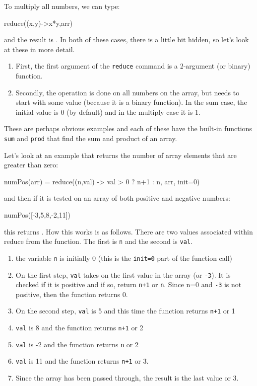 To multiply all numbers, we can type:
%
\begin{jlblock}[fp]
reduce((x,y)->x*y,arr)
\end{jlblock}
and the result is \printpythontex[verb].  In both of these cases, there is a little bit hidden, so let's look at these in more detail. 
\begin{enumerate}
\item  First, the first argument of the \texttt{reduce} command is a 2-argument (or binary) function.  
\item Secondly, the operation is done on all numbers on the array, but needs to start with some value (because it is a binary function).  In the sum case, the initial value is 0 (by default) and in the multiply case it is 1.  
\end{enumerate}


These are perhaps obvious examples and each of these have the built-in functions \texttt{sum} and \texttt{prod} that find the sum and product of an array. 

Let's look at an example that returns the number of array elements that are greater than zero:
%
\begin{jlblock}[fp]
numPos(arr) = reduce((n,val) -> val > 0 ? n+1 : n, arr, init=0)
\end{jlblock}
%
and then if it is tested on an array of both positive and negative
numbers:
%
\begin{jlblock}[fp]
numPos([-3,5,8,-2,11])
\end{jlblock}
%
this returns \printpythontex[verb]. How this works is as follows. There are two values
associated within reduce from the function. The first is \texttt{n} and the second is \texttt{val}.

\begin{enumerate}
\item  the variable \texttt{n} is initially 0 (this is the \texttt{init=0}
  part of the function call)
\item  On the first step, \texttt{val} takes on the first value in the array
  (or \texttt{-3}). It is checked if it is positive and if so, return
  \texttt{n+1} or \texttt{n}.  Since n=0 and \texttt{-3} is not positive, then the function returns 0.
\item  On the second step, \texttt{val} is 5 and this time the function
  returns \texttt{n+1} or 1
\item  \texttt{val} is 8 and the function returns \texttt{n+1} or 2
\item  \texttt{val} is -2 and the function returns \texttt{n} or 2
\item  \texttt{val} is 11 and the function returns \texttt{n+1} or 3.
\item  Since the array has been passed through, the result is the last value or 3.
\end{enumerate}

